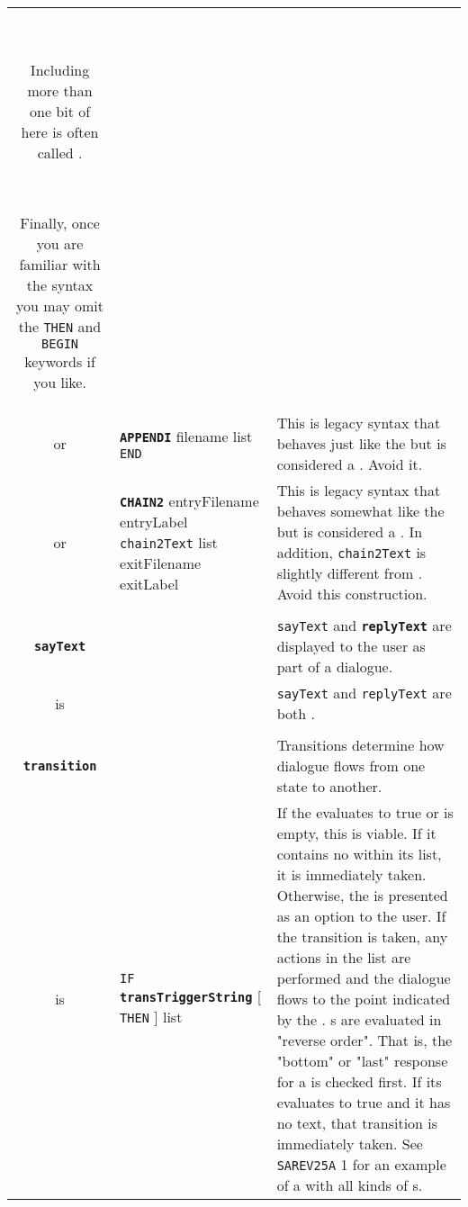\documentclass{article}
\def\ttref#1{\ahrefloc{#1}{\tt #1}}
\def\DEFINE#1{{\tt \bf #1}\label{#1}\index{#1}}
\def\t#1{{\tt #1}}
\def\Slist{{\color{red} list }}
\def\Ob{{\color{red} [ }}
\def\Oe{{\color{red} ] }}
\begin{document}
\begin{tabular}{cp{10in}|p{10in}}
  \

  Including more than one bit of \ttref{sayText} here is often called
  \ttref{Multisay}.

  \

  Finally, once you are familiar with the syntax you may omit the \t{THEN}
  and \t{BEGIN} keywords if you like.
  \\

or & \DEFINE{APPENDI} filename \ttref{state} \Slist \t{END} &
  This is legacy syntax that behaves just like the \ttref{D Action}
  \ttref{APPEND} but is considered a \ttref{state}. Avoid it. \\

or & \DEFINE{CHAIN2} entryFilename entryLabel
  \t{chain2Text} \Slist exitFilename exitLabel &
  This is legacy syntax that behaves somewhat like the \ttref{D Action}
  \ttref{CHAIN} but is considered a \ttref{state}. In addition,
  \t{chain2Text} is slightly different from \ttref{chainText}. Avoid
  this construction. \\

\\

\DEFINE{sayText} & & \t{sayText} and \DEFINE{replyText} are displayed to
the user as part of a dialogue. \\
is & \ttref{text} & \t{sayText} and \t{replyText} are both \ttref{text}. \\

\\

\DEFINE{transition} & & Transitions determine how dialogue flows from one
state to another. \\

is & \t{IF} \DEFINE{transTriggerString} \Ob \t{THEN} \Oe
      \ttref{transFeature} \Slist \ttref{transNext} &
    If the \ttref{transTriggerString} evaluates to true or is empty, this
    \ttref{transition} is viable. If it contains no \ttref{replyText}
    within its \ttref{transFeature} list, it is immediately taken.
    Otherwise, the \ttref{replyText} is presented as an option to the user.
    If the transition is taken, any actions in the \ttref{transFeature}
    list are performed and the dialogue flows to the point indicated by the
    \ttref{transNext}.
  \ttref{transition}s are evaluated in "reverse order". That is, the "bottom"
  or "last" response for a \ttref{state} is checked first. If its
  \ttref{transTriggerString}
  evaluates to true and it has no \ttref{REPLY} text, that transition is
  immediately taken. See \t{SAREV25A} \ttref{state} 1 for an example of a
  \ttref{state} with all kinds of \ttref{transition}s. \\


\end{tabular}
\end{document}
